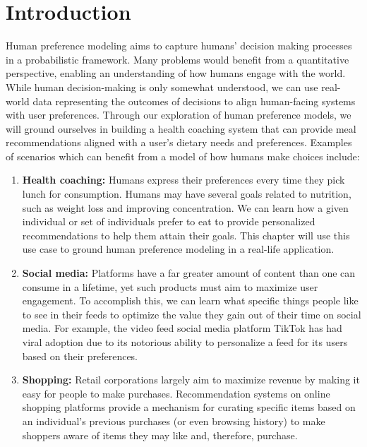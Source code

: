 \documentclass[
  letterpaper,
  numbers=noenddot,
  DIV=11,
  oneside]{scrreprt}
\theoremstyle{remark}
\DeclareRobustCommand{\href}[2]{#2\sidenote{\footnotesize \url{#1}}}
\begin{document}
\section{Introduction}\label{introduction}

Human preference modeling aims to capture humans' decision making
processes in a probabilistic framework. Many problems would benefit from
a quantitative perspective, enabling an understanding of how humans
engage with the world. While human decision-making is only somewhat
understood, we can use real-world data representing the outcomes of
decisions to align human-facing systems with user preferences. Through
our exploration of human preference models, we will ground ourselves in
building a health coaching system that can provide meal recommendations
aligned with a user's dietary needs and preferences. Examples of
scenarios which can benefit from a model of how humans make choices
include:

\begin{enumerate}
\def\labelenumi{\arabic{enumi}.}
\item
  \textbf{Health coaching:} Humans express their preferences every time
  they pick lunch for consumption. Humans may have several goals related
  to nutrition, such as weight loss and improving concentration. We can
  learn how a given individual or set of individuals prefer to eat to
  provide personalized recommendations to help them attain their goals.
  This chapter will use this use case to ground human preference
  modeling in a real-life application.
\item
  \textbf{Social media:} Platforms have a far greater amount of content
  than one can consume in a lifetime, yet such products must aim to
  maximize user engagement. To accomplish this, we can learn what
  specific things people like to see in their feeds to optimize the
  value they gain out of their time on social media. For example, the
  video feed social media platform
  \href{https://www.tiktok.com/}{TikTok} has had viral adoption due to
  its notorious ability to personalize a feed for its users based on
  their preferences.
\item
  \textbf{Shopping:} Retail corporations largely aim to maximize revenue
  by making it easy for people to make purchases. Recommendation systems
  on online shopping platforms provide a mechanism for curating specific
  items based on an individual's previous purchases (or even browsing
  history) to make shoppers aware of items they may like and, therefore,
  purchase.
\end{enumerate}
\end{document}

